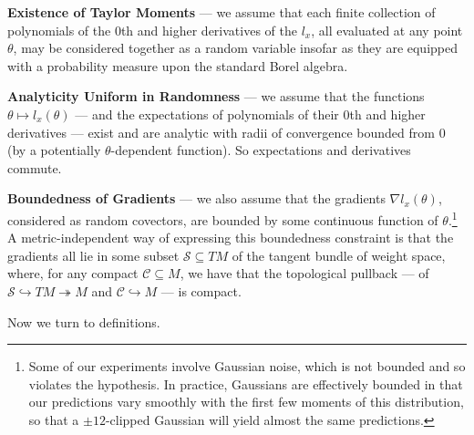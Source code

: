 \documentclass[anon,12pt]{colt2021} %
\newcommand{\Cc}{\mathcal{C}}   \newcommand{\CC}{\mathbb{C}}
\newcommand{\Ss}{\mathcal{S}}
\begin{document}
        \textbf{Existence of Taylor Moments} --- we assume
        that each finite collection of polynomials of the $0$th and higher
        derivatives of the $l_x$, all evaluated at any point $\theta$, may be
        considered together as a random variable insofar as they are equipped
        with a probability measure upon the standard Borel algebra.

        \textbf{Analyticity Uniform in Randomness} --- we assume that
        the functions $\theta \mapsto l_x(\theta)$ --- and the expectations
        of polynomials of their $0$th and higher derivatives --- exist and are
        analytic with radii of convergence bounded from $0$ (by a potentially
        $\theta$-dependent function).  So expectations and derivatives commute. 

        \textbf{Boundedness of Gradients} --- we also assume that the gradients
        $\nabla l_x(\theta)$, considered as random covectors, are bounded by
        some continuous function of $\theta$.\footnote{
            Some of our experiments involve Gaussian noise, which is not
            bounded and so violates the hypothesis.  In practice, Gaussians are
            effectively bounded
            in that
            our predictions vary smoothly with the first few moments of this
            distribution, so that a $\pm 12$-clipped Gaussian will yield almost
            the same predictions.
        }
        A metric-independent way of expressing this boundedness constraint
        is that the gradients all lie in some subset $\Ss \subseteq TM$ of
        the tangent bundle of weight space, where, for any compact $\Cc
        \subseteq M$, we have that the topological pullback --- of
        $\Ss \hookrightarrow TM \twoheadrightarrow M$
        and
        $\Cc \hookrightarrow M$ ---
        is compact.
        
        Now we turn to definitions.
\end{document}
